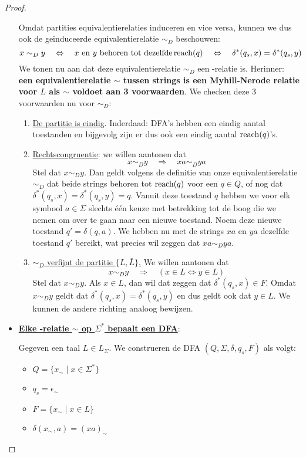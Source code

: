 \documentclass[../aanvullingen_cursus.tex]{subfiles}
\begin{document}
\begin{proof}
\begin{itemize}
		Omdat partities equivalentierelaties induceren en vice versa, kunnen we dus ook de geïnduceerde equivalentierelatie \(\sim_D\) beschouwen: \[x \sim_D y \quad \Leftrightarrow \quad x \text{ en } y \text{ behoren tot dezelfde} \operatorname{reach}(q) \quad \Leftrightarrow \quad \delta^*(q_s,x)=\delta^*(q_s,y)\] We tonen nu aan dat deze equivalentierelatie \(\sim_D\) een \mnl-relatie is. Herinner: \textbf{een equivalentierelatie \(\sim\) tussen strings is een Myhill-Nerode relatie voor \(L\) als \(\sim\) voldoet aan 3 voorwaarden}. We checken deze 3 voorwaarden nu voor \(\sim_D\):
		\begin{enumerate}
			\item \underline{De partitie is eindig}. Inderdaad: DFA's hebben een eindig aantal toestanden en bijgevolg zijn er dus ook een eindig aantal \(\operatorname{reach}(q)\)'s.
			\item \underline{Rechtscongruentie}: we willen aantonen dat \[x \sim_D y \quad \Rightarrow \quad xa \sim_D ya\] Stel dat \(x \sim_D y\). Dan geldt volgens de definitie van onze equivalentierelatie \(\sim_D\) dat beide strings behoren tot \(\operatorname{reach}(q)\) voor een \(q\in Q\), of nog dat \(\delta^*(q_s,x)=\delta^*(q_s,y)=q\). Vanuit deze toestand \(q\) hebben we voor elk symbool \(a \in \Sigma\) slechts één keuze met betrekking tot de boog die we nemen om over te gaan naar een nieuwe toestand. Noem deze nieuwe toestand \(q'=\delta(q,a)\). We hebben nu met de strings \(xa\) en \(ya\) dezelfde toestand \(q'\) bereikt, wat precies wil zeggen dat \(xa \sim_D ya\).
			\item \underline{\(\sim_D\) verfijnt de partitie \(\{L,\bar{L}\}\).} We willen aantonen dat \[x \sim_D y \quad \Rightarrow \quad (x\in L \Leftrightarrow y \in L)\] Stel dat \(x \sim_D y\). Als \(x \in L\), dan wil dat zeggen dat \(\delta^*(q_s,x)\in F\). Omdat \(x \sim_D y\) geldt dat \(\delta^*(q_s,x)=\delta^*(q_s,y)\) en dus geldt ook dat \(y \in L\). We kunnen de andere richting analoog bewijzen.
		\end{enumerate}

		\newpage
		\item \underline{\textbf{Elke \mnl-relatie \(\sim\) op \(\Sigma^*\) bepaalt een DFA}}:

		Gegeven een taal \(L \in L_\Sigma\). We construeren de DFA \((Q,\Sigma,\delta,q_s,F)\) als volgt:
		\begin{itemize}
			\item \(Q=\{x_{\sim} \mid x \in \Sigma^*\}\)
			\item \(q_s = \epsilon_{\sim}\)
			\item \(F = \{x_{\sim} \mid x \in L\}\)
			\item \(\delta(x_{\sim},a)=(xa)_{\sim}\)
		\end{itemize}


\end{itemize}
\end{proof}
\end{document}
